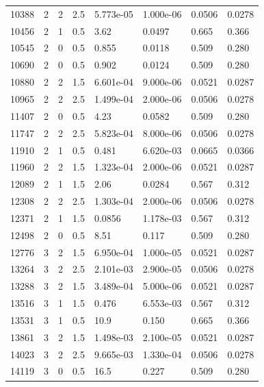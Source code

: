 \documentclass[preview]{standalone}
\begin{document}
{{{\begin{tabular}{L{1.2cm}C{1.2cm} C{0.3cm}C{0.5cm} C{1.4cm}C{1.4cm} C{1.4cm}C{1.4cm}}
  10388  &     2  & 2     & 2.5 &  5.773e-05  & 1.000e-06  & 0.0506 &  0.0278   \\ 
  10456  &     2  & 1     & 0.5 &  3.62  & 0.0497  & 0.665 &  0.366   \\ 
  10545  &     2  & 0     & 0.5 &  0.855  & 0.0118  & 0.509 &  0.280   \\ 
  10690  &     2  & 0     & 0.5 &  0.902  & 0.0124  & 0.509 &  0.280   \\ 
  10880  &     2  & 2     & 1.5 &  6.601e-04  & 9.000e-06  & 0.0521 &  0.0287   \\ 
  10965  &     2  & 2     & 2.5 &  1.499e-04  & 2.000e-06  & 0.0506 &  0.0278   \\ 
  11407  &     2  & 0     & 0.5 &  4.23  & 0.0582  & 0.509 &  0.280   \\ 
  11747  &     2  & 2     & 2.5 &  5.823e-04  & 8.000e-06  & 0.0506 &  0.0278   \\ 
  11910  &     2  & 1     & 0.5 &  0.481  & 6.620e-03  & 0.0665 &  0.0366   \\ 
  11960  &     2  & 2     & 1.5 &  1.323e-04  & 2.000e-06  & 0.0521 &  0.0287   \\ 
  12089  &     2  & 1     & 1.5 &  2.06  & 0.0284  & 0.567 &  0.312   \\ 
  12308  &     2  & 2     & 2.5 &  1.303e-04  & 2.000e-06  & 0.0506 &  0.0278   \\ 
  12371  &     2  & 1     & 1.5 &  0.0856  & 1.178e-03  & 0.567 &  0.312   \\ 
  12498  &     2  & 0     & 0.5 &  8.51  & 0.117  & 0.509 &  0.280   \\ 
  12776  &     3  & 2     & 1.5 &  6.950e-04  & 1.000e-05  & 0.0521 &  0.0287   \\ 
  13264  &     3  & 2     & 2.5 &  2.101e-03  & 2.900e-05  & 0.0506 &  0.0278   \\ 
  13288  &     3  & 2     & 1.5 &  3.489e-04  & 5.000e-06  & 0.0521 &  0.0287   \\ 
  13516  &     3  & 1     & 1.5 &  0.476  & 6.553e-03  & 0.567 &  0.312   \\ 
  13531  &     3  & 1     & 0.5 &  10.9  & 0.150  & 0.665 &  0.366   \\ 
  13861  &     3  & 2     & 1.5 &  1.498e-03  & 2.100e-05  & 0.0521 &  0.0287   \\ 
  14023  &     3  & 2     & 2.5 &  9.665e-03  & 1.330e-04  & 0.0506 &  0.0278   \\ 
  14119  &     3  & 0     & 0.5 &  16.5  & 0.227  & 0.509 &  0.280   \\ 

\end{tabular}}}}
\end{document}

